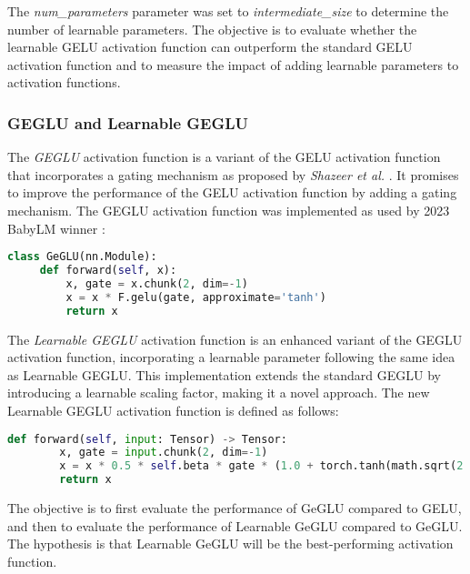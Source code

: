 The \textit{num\_parameters} parameter was set to \textit{intermediate\_size} to determine the number of learnable parameters. The objective is to evaluate whether the learnable GELU activation function can outperform the standard GELU activation function and to measure the impact of adding learnable parameters to activation functions.

\subsubsection{GEGLU and Learnable GEGLU}
The \textit{GEGLU} activation function is a variant of the GELU activation function that incorporates a gating mechanism as proposed by \textit{Shazeer et al.} \cite{Shazeer2020}. It promises to improve the performance of the GELU activation function by adding a gating mechanism. The GEGLU activation function was implemented as used by 2023 BabyLM winner \cite{Samuel2023} \cite{ltg-bert}:
\begin{lstlisting}[language=Python, caption={Implementation of GeGLU}]
    class GeGLU(nn.Module):
     def forward(self, x):
         x, gate = x.chunk(2, dim=-1)
         x = x * F.gelu(gate, approximate='tanh')
         return x
\end{lstlisting}

The \textit{Learnable GEGLU} activation function is an enhanced variant of the GEGLU activation function, incorporating a learnable parameter following the same idea as Learnable GEGLU. This implementation extends the standard GEGLU by introducing a learnable scaling factor, making it a novel approach. The new Learnable GEGLU activation function is defined as follows:

\begin{lstlisting}[language=Python, caption={Implementation of Learnable GeGLU}]
    def forward(self, input: Tensor) -> Tensor:
        x, gate = input.chunk(2, dim=-1)
        x = x * 0.5 * self.beta * gate * (1.0 + torch.tanh(math.sqrt(2.0 / math.pi) * (gate + 0.044715 * torch.pow(gate, 3.0))))
        return x
\end{lstlisting}

The objective is to first evaluate the performance of GeGLU compared to GELU, and then to evaluate the performance of Learnable GeGLU compared to GeGLU. The hypothesis is that Learnable GeGLU will be the best-performing activation function.

